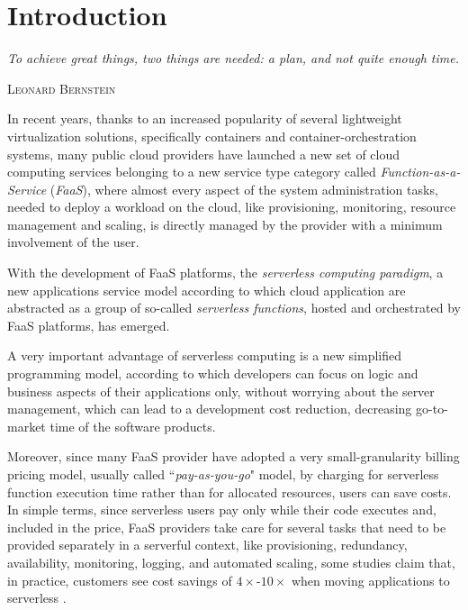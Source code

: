 \documentclass[12pt,a4paper]{report}
\newcommand{\ItalicQuotMark}[1]{``\textit{#1}"}
\begin{document}

\tableofcontents	
\listoffigures
\listoftables
\listofalgorithms
{}

\renewcommand{\textflush}{flushleft}
\setlength{}

\chapter{Introduction}\label{chapterIntro}
\epigraph{\itshape To achieve great things, two things are needed: a plan, and not quite enough time.}{\textsc{Leonard Bernstein}}

In recent years, thanks to an increased popularity of several lightweight virtualization solutions, specifically containers and container-orchestration systems, many public cloud providers have launched a new set of cloud computing services belonging to a new service type category called \textit{Function-as-a-Service} (\textit{FaaS}), where almost every aspect of the system administration tasks, needed to deploy a workload on the cloud, like provisioning, monitoring, resource management and scaling, is directly managed by the provider with a minimum involvement of the user.

With the development of FaaS platforms, the \textit{serverless computing paradigm}, a new applications service model according to which cloud application are abstracted as a group of so-called \textit{serverless functions}, hosted and orchestrated by FaaS platforms, has emerged. 

A very important advantage of serverless computing is a new simplified programming model, according to which developers can focus on logic and business aspects of their applications only, without worrying about the server management, which can lead to a development cost reduction, decreasing go-to-market time of the software products.

Moreover, since many FaaS provider have adopted a very small-granularity billing pricing model, usually called \ItalicQuotMark{pay-as-you-go} model, by charging for serverless function execution time rather than for allocated resources, users can save costs. In simple terms, since serverless users pay only while their code executes and, included in the price, FaaS providers take care for several tasks that need to be provided separately in a serverful context, like  provisioning, redundancy, availability, monitoring, logging, and automated scaling, some studies claim that, in practice, customers see cost savings of $4\times$-$10\times$ when moving applications to serverless \cite{NextPhase}.
\end{document}
